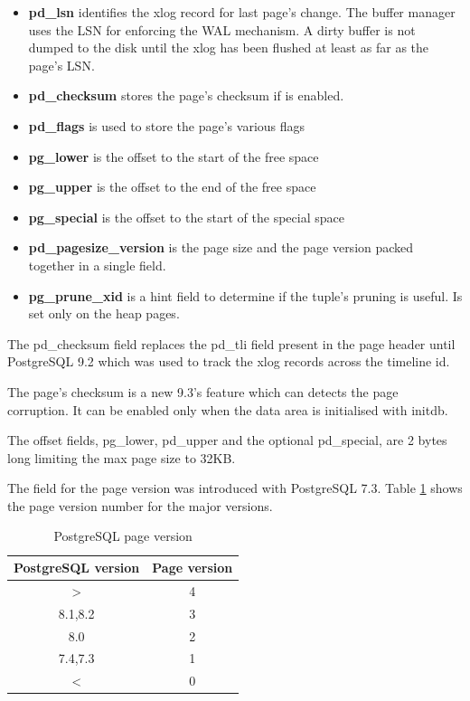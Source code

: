 \begin{itemize}
 \item \textbf{pd\_lsn} identifies the xlog record for last page's change.  The 
buffer manager uses the  LSN for enforcing the WAL mechanism. A dirty buffer is not 
dumped to the disk until the xlog has been flushed at least as far as the page's LSN.
\item \textbf{pd\_checksum} stores the page's checksum if is enabled.
\item \textbf{pd\_flags} is used to store the page's various flags 
\item \textbf{pg\_lower} is the offset to the start of the free space
\item \textbf{pg\_upper} is the offset to the end of the free space
\item \textbf{pg\_special} is the offset to the start of the special space
\item \textbf{pd\_pagesize\_version} is the page size and the page version packed 
together in a single field. 
\item \textbf{pg\_prune\_xid} is a hint field to determine if the tuple's pruning is 
useful. Is set only on the heap pages.

\end{itemize}

The pd\_checksum field replaces the pd\_tli field present in the page 
header until PostgreSQL 9.2 which was used to track the xlog records across the timeline id. 
\newline 

The page's checksum is a new 9.3's feature which can detects the page corruption. It can be enabled only 
when the data area is initialised with initdb.\newline

The offset fields, pg\_lower, pd\_upper and the optional pd\_special, are 2 bytes long limiting the 
max page size to 32KB.\newline

The field for the page version was introduced with PostgreSQL 7.3. 
Table \ref{tab:PGPAGEVERSION} shows the page version number for the major versions.

\begin{table}[h]
  \begin{tabular}{cc}
    PostgreSQL version & Page version\\
    \hline
    \textgreater \space 8.3  &  4\\
    8.1,8.2  &  3\\
    8.0  &  2\\
    7.4,7.3  &  1\\
    \textless \space 7.3  &  0\\
    
    
  \end{tabular}
  \caption{\label{tab:PGPAGEVERSION}PostgreSQL page version}
\end{table}

